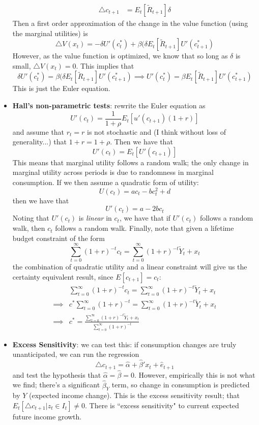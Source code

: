 \documentclass[12pt]{article}
\begin{document}
\begin{itemize}
\[\begin{split}
        \triangle c_{t+1} &= E_t[\widetilde{R}_{t+1}]\delta
    \end{split}\]
    Then a first order approximation of the change in the value function (using the marginal utilities) is
    \[\triangle V(x_t) = -\delta U'(c_t^*) + \beta (\delta E_t[\widetilde{R}_{t+1}]U'(c_{t+1}^*)\]
    However, as the value function is optimized, we know that so long as $\delta$ is small, $\triangle V(x_t) = 0$. This implies that
    \[\delta U'(c_t^*) = \beta (\delta E_t[\widetilde{R}_{t+1}]U'(c_{t+1}^*) \implies U'(c_t^*) = \beta E_t[\widetilde{R}_{t+1}]U'(c_{t+1}^*)\]
    This is just the Euler equation.
    \item \textbf{Hall's non-parametric tests}: rewrite the Euler equation as
    \[U'(c_t) = \frac{1}{1+\rho}E_t[u'(c_{t+1})(1+r)]\]
    and assume that $r_t = r$ is not stochastic and (I think without loss of generality...) that $1+r = 1+\rho$. Then we have that
    \[U'(c_t) = E_t[U'(c_{t+1})]\]
    This means that marginal utility follows a random walk; the only change in marginal utility across periods is due to randomness in marginal consumption. If we then assume a quadratic form of utility:
    \[U(c_t) = ac_t -bc_t^2 + d\]
    then we have that
    \[U'(c_t) = a - 2bc_t\]
    Noting that $U'(c_t)$ is \textit{linear} in $c_t$, we have that if $U'(c_t)$ follows a random walk, then $c_t$ follows a random walk. Finally, note that given a lifetime budget constraint of the form
    \[\sum_{t=0}^{\infty} (1+r)^{-t}c_t = \sum_{t=0}^{\infty}(1+r)^{-t}\widetilde{Y}_t +x_t\]
    the combination of quadratic utility and a linear constraint will give us the certainty equivalent result, since $E[c_{t+1}] = c_t$:
    \[\begin{split}
        &\sum_{t=0}^{\infty} (1+r)^{-t}c_t = \sum_{t=0}^{\infty}(1+r)^{-t}\widetilde{Y}_t +x_t \\
        \implies &c^*\sum_{t=0}^{\infty} (1+r)^{-t} = \sum_{t=0}^{\infty}(1+r)^{-t}\widetilde{Y}_t +x_t \\
        \implies &c^* = \frac{\sum_{t=0}^{\infty}(1+r)^{-t}\widetilde{Y}_t +x_t }{\sum_{t=0}^{\infty} (1+r)^{-t}}
    \end{split}\]
    \item \textbf{Excess Sensitivity}: we can test this: if consumption changes are truly unanticipated, we can run the regression
    \[\triangle c_{t+1} = \hat{\alpha} + \hat{\beta}'x_t + \hat{e}_{t+1}\]
    and test the hypothesis that $\hat{\alpha} = \hat{\beta} = 0$. However, empirically this is not what we find; there's a significant $\hat{\beta}_Y$ term, so change in consumption is predicted by $Y$ (expected income change). This is the excess sensitivity result; that $E_t[\triangle c_{t+1}|z_t \in I_t] \neq 0$. There is ``excess sensitivity" to current expected future income growth.
\end{itemize}
\end{document}
